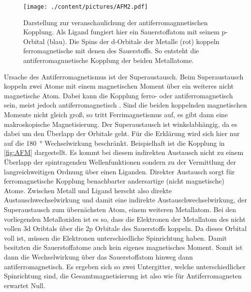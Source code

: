         \begin{figure}
            \centering
            \texttt{[image: ./content/pictures/AFM2.pdf]}
            \caption{Darstellung zur veranschaulichung der antiferromagnnetischen Kopplung.
            Als Ligand fungiert hier ein Sauerstoffatom mit seinem p-Orbital (blau).
            Die Spins der d-Orbitale der Metalle (rot) koppeln ferromagnetische mit denen des Sauerstoffs.
            So entsteht die antiferromagnnetische Kopplung der beiden Metallatome.}
            \label{fig:AFM}
        \end{figure}
        Ursache des Antiferromagnetismus ist der Superaustausch.
        Beim Superaustausch koppeln zwei Atome mit einem magnetischen Moment über ein weiteres nicht magnetische Atom. 
        Dabei kann die Kopplung ferro- oder antiferromagnetisch sein, meist jedoch antiferromagnetisch \cite{AFM_1}.
        Sind die beiden koppelnden magnetischen Momente nicht gleich groß, so tritt Ferrimagnetismus auf, es gibt dann eine makroskopische Magnetisierung.
        Der Superaustausch ist winkelabhängig, da es dabei um den Überlapp der Orbitale geht.
        Für die Erklärung wird sich hier nur auf die \SI{180}{\degree} Wechselwirkung beschränkt.
        Beispielhaft ist die Kopplung in \autoref{fig:AFM} dargestellt.
        Es kommt bei diesem indirekten Austausch nicht zu einem Überlapp der spintragenden Wellenfunktionen sondern zu der Vermittlung der langreichweitigen Ordnung über einen Liganden.
        Direkter Austausch sorgt für ferromagnetische Kopplung benachbarter andersartige (nicht magnetische) Atome.
        Zwischen Metall und Ligand herscht also direkte Austauschwechselwirkung und damit eine indirekte Austauschwechselwirkung, der Superaustausch zum übernächsten Atom, einem weiteren Metallatom.
        Bei den vorliegenden Metalloxiden ist es so, dass die Elektronen der Metallatom des nicht vollen 3d Oribtals über die 2p Orbitale des Sauerstoffs koppeln.
        Da dieses Orbital voll ist, müssen die Elektronen unterschiedliche Spinrichtung haben.
        Damit besitzten die Sauerstoffatome auch kein eigenes magnetisches Moment.
        Somit ist dann die Wechselwirkung über das Sauerstoffatom hinweg dann antiferromagnetisch.
        Es ergeben sich so zwei Untergitter, welche unterschiedlicher Spinrichtung sind, die Gesamtmagnetisierung ist also wie für Antiferromagneten erwartet Null.
            
